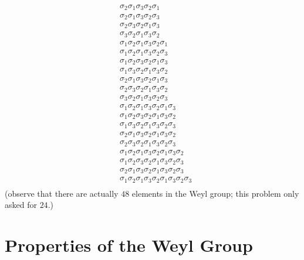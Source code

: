 \documentclass[11pt, headheight=30pt]{scrartcl}
\begin{document}
\begin{enumerate}[(1)]
\begin{align*}
        &\sigma_2 \sigma_1 \sigma_3 \sigma_2 \sigma_1\\
        &\sigma_2 \sigma_1 \sigma_3 \sigma_2 \sigma_3\\
        &\sigma_2 \sigma_3 \sigma_2 \sigma_1 \sigma_3\\
        &\sigma_3 \sigma_2 \sigma_1 \sigma_3 \sigma_2\\
        &\sigma_1 \sigma_2 \sigma_1 \sigma_3 \sigma_2 \sigma_1\\
        &\sigma_1 \sigma_2 \sigma_1 \sigma_3 \sigma_2 \sigma_3\\
        &\sigma_1 \sigma_2 \sigma_3 \sigma_2 \sigma_1 \sigma_3\\
        &\sigma_1 \sigma_3 \sigma_2 \sigma_1 \sigma_3 \sigma_2\\
        &\sigma_2 \sigma_1 \sigma_3 \sigma_2 \sigma_1 \sigma_3\\
        &\sigma_2 \sigma_3 \sigma_2 \sigma_1 \sigma_3 \sigma_2\\
        &\sigma_3 \sigma_2 \sigma_1 \sigma_3 \sigma_2 \sigma_3\\
        &\sigma_1 \sigma_2 \sigma_1 \sigma_3 \sigma_2 \sigma_1 \sigma_3\\
        &\sigma_1 \sigma_2 \sigma_3 \sigma_2 \sigma_1 \sigma_3 \sigma_2\\
        &\sigma_1 \sigma_3 \sigma_2 \sigma_1 \sigma_3 \sigma_2 \sigma_3\\
        &\sigma_2 \sigma_1 \sigma_3 \sigma_2 \sigma_1 \sigma_3 \sigma_2\\
        &\sigma_2 \sigma_3 \sigma_2 \sigma_1 \sigma_3 \sigma_2 \sigma_3\\
        &\sigma_1 \sigma_2 \sigma_1 \sigma_3 \sigma_2 \sigma_1 \sigma_3 \sigma_2\\
        &\sigma_1 \sigma_2 \sigma_3 \sigma_2 \sigma_1 \sigma_3 \sigma_2 \sigma_3\\
        &\sigma_2 \sigma_1 \sigma_3 \sigma_2 \sigma_1 \sigma_3 \sigma_2 \sigma_3\\
        &\sigma_1 \sigma_2 \sigma_1 \sigma_3 \sigma_2 \sigma_1 \sigma_3 \sigma_2 \sigma_3\\
    \end{align*}
    (observe that there are actually $48$ elements in the Weyl group; this problem
    only asked for $24$.)
\end{enumerate}



\section{Properties of the Weyl Group}
\end{document}
